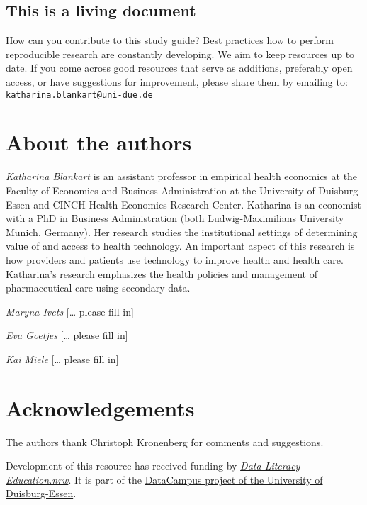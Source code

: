\documentclass[
]{book}
\begin{document}
\hypertarget{this-is-a-living-document}{%
\section*{This is a living document}\label{this-is-a-living-document}}

How can you contribute to this study guide? Best practices how to
perform reproducible research are constantly developing. We aim to keep
resources up to date. If you come across good resources that serve as
additions, preferably open access, or have suggestions for improvement,
please share them by emailing to:
\href{mailto:katharina.blankart@uni-due.de}{\nolinkurl{katharina.blankart@uni-due.de}}

\hypertarget{about-the-authors}{%
\chapter*{About the authors}\label{about-the-authors}}

\emph{Katharina Blankart} is an assistant professor in empirical health
economics at the Faculty of Economics and Business Administration at the
University of Duisburg-Essen and CINCH Health Economics Research Center.
Katharina is an economist with a PhD in Business Administration (both
Ludwig-Maximilians University Munich, Germany). Her research studies the
institutional settings of determining value of and access to health
technology. An important aspect of this research is how providers and
patients use technology to improve health and health care. Katharina's
research emphasizes the health policies and management of pharmaceutical
care using secondary data.

\emph{Maryna Ivets} {[}\ldots{} please fill in{]}

\emph{Eva Goetjes} {[}\ldots{} please fill in{]}

\emph{Kai Miele} {[}\ldots{} please fill in{]}

\hypertarget{acknowledgements}{%
\chapter*{Acknowledgements}\label{acknowledgements}}

The authors thank Christoph Kronenberg for comments and suggestions.

Development of this resource has received funding by
\href{https://www.dh.nrw/aktuelles/ausschreibung}{\emph{Data Literacy
Education.nrw}}. It is part of the
\href{https://www.uni-due.de/ub/datacampus/index.php}{DataCampus project
of the University of Duisburg-Essen}.
\end{document}
